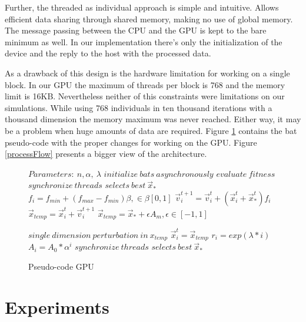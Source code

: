 \documentclass[conference]{IEEEtran}
\begin{document}
Further, the threaded as individual approach is simple and intuitive.
Allows efficient data sharing through shared memory, making no use of global memory.
The message passing between the CPU and the GPU is kept to the bare minimum as well.
In our implementation there's only the initialization of the device and
the reply to the host with the processed data.


As a drawback of this design is the hardware limitation for working
on a single block. In our GPU the maximum of threads per block is 768
and the memory limit is 16KB. Nevertheless neither of this constraints
were limitations on our simulations. While using 768 individuals in ten
thousand iterations with a thousand dimension the memory maximum was
never reached. Either way, it may be a problem when huge amounts of data
are required. Figure \ref{gpu-pseudo} contains the bat pseudo-code with
the proper changes for working on the GPU. Figure \ref{processFlow}
presents a bigger view of the architecture.

\begin{figure}[H]
\begin{algorithmic}[1]
\State $Parameters:\ n,\alpha,\ \lambda$
\State $initialize\ bats\ asynchronously$
\State $evaluate\ fitness$
\State $synchronize\ threads$
\State $selects\ best\ \vec{x}_*$
        \State $f_i=f_{min} + (f_{max} - f_{min})\beta, \in \beta [0,1]$
        \State $\vec{v}_i^{t+1} = \vec{v}_i^{t} + (\vec{x}_i^{t} + \vec{x}_*^{t})f_i$
        \State $\vec{x}_{temp} = \vec{x}_i^{t} + \vec{v}_i^{t+1}$
            \State $\vec{x}_{temp} = \vec{x}_* + \epsilon A_m, \epsilon \in [-1, 1]$
        \EndIf

        \State $single\ dimension\ perturbation\ in\ x_{temp}$
            \State $\vec{x}_i^t = \vec{x}_{temp}$
            \State $r_i = exp(\lambda * i)$
            \State $A_i =  A_{0} * \alpha^i$
        \EndIf
    \EndFor
    \State $synchronize\ threads$
    \State $selects\ best\ \vec{x}_*$
\EndWhile
\end{algorithmic}
\caption{Pseudo-code GPU}
\label{gpu-pseudo}
\end{figure}


\section{Experiments} \label{experiments}%
\end{document}
